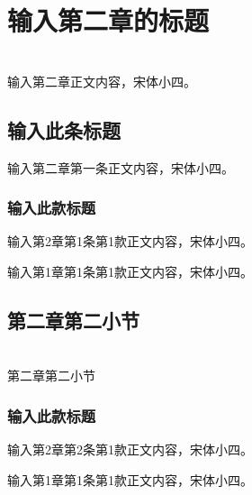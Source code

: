 
\newpage
\section{输入第二章的标题} %

~\\
    
    \song{}
    输入第二章正文内容，宋体小四。  


    \subsection{输入此条标题} %

        输入第二章第一条正文内容，宋体小四。

        \subsubsection{输入此款标题} %

            输入第2章第1条第1款正文内容，宋体小四。


                输入第1章第1条第1款正文内容，宋体小四。




\subsection{第二章第二小节} %

~\\
    
    第二章第二小节

    \subsubsection{输入此款标题} %

        输入第2章第2条第1款正文内容，宋体小四。


            输入第1章第1条第1款正文内容，宋体小四。







